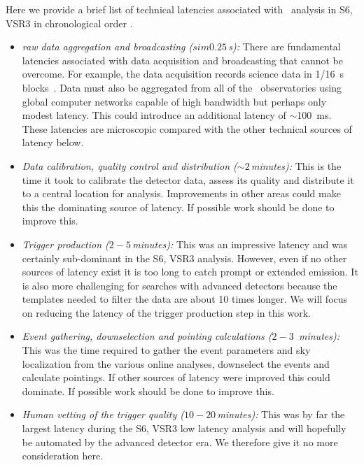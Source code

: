 Here we provide a brief list of technical latencies associated with \CBC\
analysis in S6, VSR3 in chronological order \citep{HugheyGWPAW2011}.
%
\begin{itemize}
%
\item {\it raw data aggregation and broadcasting ($sim 0.25$\,s):}  There are
fundamental latencies associated with data acquisition and broadcasting that
cannot be overcome.  For example, the \LIGO{} data acquisition records science
data in 1/16~s blocks~\citep{Bork2001}. Data must also be aggregated from all
of the \GW\ observatories using global computer networks capable of high
bandwidth but perhaps only modest latency.  This could introduce an additional
latency of $\sim$100~ms.  These latencies are microscopic compared with the
other technical sources of latency below. 
%
\item {\it Data calibration, quality control and distribution ($\sim
2$\,minutes):}  This is the time it took to calibrate the detector data, assess
its quality and distribute it to a central location for analysis.  Improvements
in other areas could make this the dominating source of latency. If possible
work should be done to improve this.
%
\item {\it Trigger production ($2-5$\,minutes):} This was an impressive latency
and was certainly sub-dominant in the S6, VSR3 analysis.  However, even if no
other sources of latency exist it is too long to catch prompt or extended
emission.  It is also more challenging for searches with advanced detectors
because the templates needed to filter the data are about 10 times longer.  We
will focus on reducing the latency of the trigger production step in this work.
%
\item {\it Event gathering, downselection and pointing calculations ($2-3$\,
minutes):} This was the time required to gather the event parameters and sky
localization from the various online analyses, downselect the events and
calculate pointings.  If other sources of latency were improved this could
dominate.  If possible work should be done to improve this.
%
\item {\it Human vetting of the trigger quality ($10-20$\,minutes):}  This was
by far the largest latency during the S6, VSR3 low latency analysis and will
hopefully be automated by the advanced detector era.  We therefore give it no
more consideration here.
%
\end{itemize}
%

